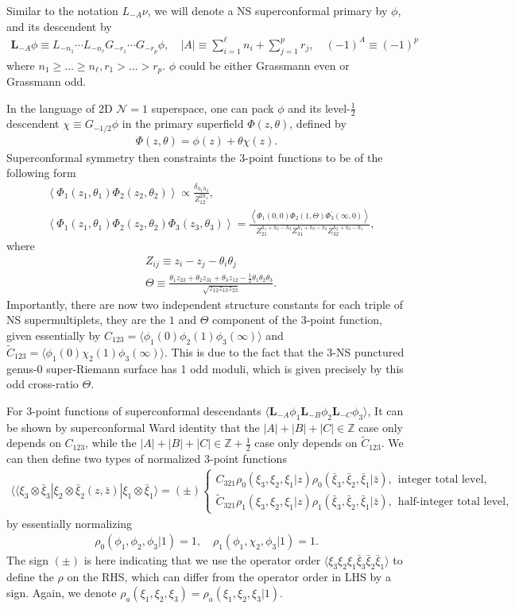 \documentclass[12pt]{article}
\newcommand{\ie}{\begin{equation}\begin{aligned}}
\newcommand{\fe}{\end{aligned}\end{equation}}
\numberwithin{equation}{section}
\begin{document}
Similar to the notation $L_{-A}\nu$, we will denote a NS superconformal primary by $\phi$, and its descendent by
\ie
\mathbf{L}_{-A}\phi \equiv L_{-n_1}\cdots L_{-n_\ell} G_{-r_1}\cdots G_{-r_p} \phi,\quad |A|\equiv \sum_{i=1}^\ell n_i + \sum_{j=1}^{p} r_j,\quad (-1)^A \equiv (-1)^{p}
\fe
where $n_1 \geq ... \geq n_\ell, r_1>...>r_p$. $\phi$ could be either Grassmann even or Grassmann odd.

In the language of 2D $\mathcal{N}=1$ superspace, one can pack $\phi$ and its level-$\frac{1}{2}$ descendent $\chi \equiv G_{-1/2}\phi$ in the primary superfield $\Phi(z,\theta)$, defined by
\ie
\Phi(z,\theta) = \phi(z)+\theta \chi(z).
\fe
Superconformal symmetry then constraints the 3-point functions to be of the following form
\ie \label{superspace23pt}
& \left\langle\Phi_1(z_1, \theta_1) \Phi_2(z_2, \theta_2)\right\rangle \propto \frac{\delta_{h_1 h_2}}{Z_{12}^{2 h_1}}, \\
& \left\langle\Phi_1(z_1, \theta_1) \Phi_2(z_2, \theta_2) \Phi_3(z_3, \theta_3)\right\rangle=\frac{\left\langle\Phi_1(0,0) \Phi_2(1, \Theta) \Phi_3^{\prime}(\infty, 0)\right\rangle}{Z_{21}^{h_1+h_2-h_3} Z_{31}^{h_1+h_3-h_2} Z_{32}^{h_2+h_3-h_1}},
\fe
where
\ie
& Z_{i j} \equiv z_i-z_j-\theta_i \theta_j \\
& \Theta \equiv \frac{\theta_1 z_{23}+\theta_2 z_{31}+\theta_3 z_{12}-\frac{1}{2} \theta_1 \theta_2 \theta_3}{\sqrt{z_{12} z_{13} z_{23}}} .
\fe
Importantly, there are now two independent structure constants for each triple of NS supermultiplets, they are the $1$ and $\Theta$ component of the 3-point function, given essentially by $C_{123}=\langle \phi_1(0)\phi_2(1)\phi_3(\infty)\rangle$ and $\tilde{C}_{123}=\langle \phi_1(0)\chi_2(1)\phi_3(\infty)\rangle$. This is due to the fact that the 3-NS punctured genus-0 super-Riemann surface has 1 odd moduli, which is given precisely by this odd cross-ratio $\Theta$.

For 3-point functions of superconformal descendants $\langle\mathbf{L}_{-A}\phi_1\mathbf{L}_{-B}\phi_2\mathbf{L}_{-C}\phi_3\rangle$, It can be shown by superconformal Ward identity that the $|A|+|B|+|C|\in \mathbb{Z}$ case only depends on $C_{123}$, while the $|A|+|B|+|C|\in \mathbb{Z}+\frac12$ case only depends on $\tilde{C}_{123}$. We can then define two types of normalized 3-point functions
\ie 
\langle\langle\xi_3 \otimes \bar{\xi}_3| \xi_2\otimes \bar{\xi}_2(z, \bar{z})|\xi_1 \otimes \bar{\xi}_1\rangle = (\pm)\begin{cases}
C_{321} \rho_0(\xi_3, \xi_2, \xi_1| z) \rho_0(\bar{\xi}_3, \bar{\xi}_2, \bar{\xi}_1 | \bar{z}), \ \  \text{integer total level},\\
\tilde{C}_{321} \rho_1(\xi_3, \xi_2, \xi_1| z) \rho_1(\bar{\xi}_3, \bar{\xi}_2, \bar{\xi}_1 | \bar{z}),\ \  \text{half-integer total level},
\end{cases}
\fe
by essentially normalizing 
\ie
\rho_0(\phi_1, \phi_2, \phi_3|1)=1,\quad \rho_1(\phi_1, \chi_2, \phi_3|1)=1.
\fe 
The sign $(\pm)$ is here indicating that we use the operator order $\langle \xi_3\xi_2\xi_1\bar{\xi}_3\bar{\xi}_2\bar{\xi}_1 \rangle$ to define the $\rho$ on the RHS, which can differ from the operator order in LHS by a sign. Again, we denote $\rho_a(\xi_1, \xi_2, \xi_3)=\rho_a(\xi_1, \xi_2, \xi_3|1)$.
\end{document}
